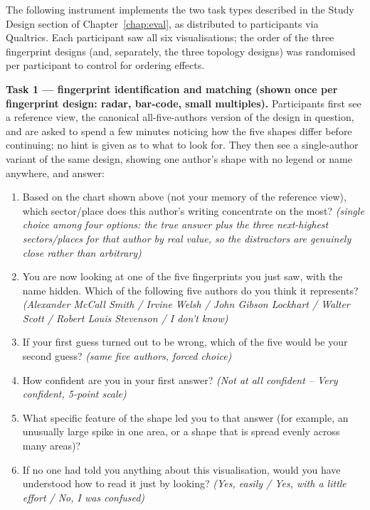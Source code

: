 \documentclass[logo,msc]{infthesis}
\begin{document}
The following instrument implements the two task types described in the Study Design section of Chapter~\ref{chap:eval}, as distributed to participants via Qualtrics. Each participant saw all six visualisations; the order of the three fingerprint designs (and, separately, the three topology designs) was randomised per participant to control for ordering effects.

\textbf{Task 1 --- fingerprint identification and matching (shown once per fingerprint design: radar, bar-code, small multiples).} Participants first see a reference view, the canonical all-five-authors version of the design in question, and are asked to spend a few minutes noticing how the five shapes differ before continuing; no hint is given as to what to look for. They then see a single-author variant of the same design, showing one author's shape with no legend or name anywhere, and answer:
\begin{enumerate}
  \item Based on the chart shown above (not your memory of the reference view), which sector/place does this author's writing concentrate on the most? \emph{(single choice among four options: the true answer plus the three next-highest sectors/places for that author by real value, so the distractors are genuinely close rather than arbitrary)}
  \item You are now looking at one of the five fingerprints you just saw, with the name hidden. Which of the following five authors do you think it represents? \emph{(Alexander McCall Smith / Irvine Welsh / John Gibson Lockhart / Walter Scott / Robert Louis Stevenson / I don't know)}
  \item If your first guess turned out to be wrong, which of the five would be your second guess? \emph{(same five authors, forced choice)}
  \item How confident are you in your first answer? \emph{(Not at all confident -- Very confident, 5-point scale)}
  \item What specific feature of the shape led you to that answer (for example, an unusually large spike in one area, or a shape that is spread evenly across many areas)?
  \item If no one had told you anything about this visualisation, would you have understood how to read it just by looking? \emph{(Yes, easily / Yes, with a little effort / No, I was confused)}
\end{enumerate}
\end{document}
